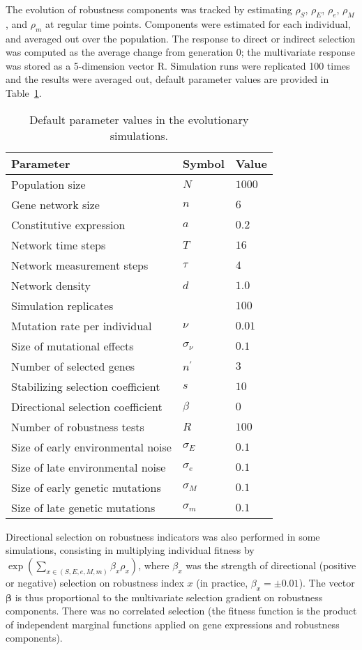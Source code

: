 \documentclass[10pt,a4paper]{article}
\newcommand{\stability}{{\rho_S}}
\newcommand{\earlyenv}{{\rho_E}}
\newcommand{\lateenv}{{\rho_e}}
\newcommand{\earlymut}{{\rho_M}}
\newcommand{\latemut}{{\rho_m}}
\begin{document}
The evolution of robustness components was tracked by estimating $\stability$, $\earlyenv$, $\lateenv$, $\earlymut$, and $\latemut$ at regular time points. Components were estimated for each individual, and averaged out over the population. The response to direct or indirect selection was computed as the average change from generation 0; the multivariate response was stored as a 5-dimension vector $\bm{\mathrm R}$. Simulation runs were replicated 100 times and the results were averaged out, default parameter values are provided in Table~\ref{tab:defpar}. 

\begin{table}
\begin{tabular}{lll}
Parameter & Symbol & Value \\ \hline
Population size & $N$ & $1000$ \\
Gene network size & $n$ & $6$ \\
Constitutive expression & $a$ & $0.2$ \\
Network time steps & $T$ & $16$ \\
Network measurement steps & $\tau$ & $4$ \\
Network density & $d$ & $1.0$ \\
Simulation replicates & & $100$ \\
Mutation rate per individual & $\nu$ & $0.01$ \\
Size of mutational effects & $\sigma_\nu$ & $0.1$ \\
Number of selected genes & $n^\prime$ & $3$ \\
Stabilizing selection coefficient & $s$ & $10$ \\
Directional selection coefficient & $\beta$ & $0$ \\
Number of robustness tests & $R$ & $100$ \\
Size of early environmental noise & $\sigma_E$ & $0.1$ \\
Size of late environmental noise & $\sigma_e$ & $0.1$ \\
Size of early genetic mutations & $\sigma_M$ & $0.1$ \\
Size of late genetic mutations & $\sigma_m$ & $0.1$ \\
\end{tabular}

\caption{\label{tab:defpar} Default parameter values in the evolutionary simulations.}
\end{table}

Directional selection on robustness indicators was also performed in some simulations, consisting in multiplying individual fitness by $\exp ( \sum_{x \in (S, E, e, M, m)} \beta_x \rho _x )$, where $\beta_x$ was the strength of directional (positive or negative) selection on robustness index $x$ (in practice, $\beta_x= \pm 0.01$). The vector $\bm\beta$ is thus proportional to the multivariate selection gradient on robustness components. There was no correlated selection (the fitness function is the product of independent marginal functions applied on gene expressions and robustness components). 
\end{document}
